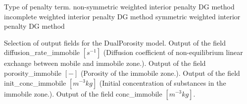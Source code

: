 \begin{SelectionType}
	{}
	{{{Type of penalty term.}}}
		\KeyItem
			{}
			{{{non-symmetric weighted interior penalty DG method}}}
		\KeyItem
			{}
			{{{incomplete weighted interior penalty DG method}}}
		\KeyItem
			{}
			{{{symmetric weighted interior penalty DG method}}}
\end{SelectionType}
\begin{SelectionType}
	{}
	{{{Selection of output fields for the DualPorosity model.}}}
		\KeyItem
			{}
			{{{Output of the field diffusion{\_}rate{\_}immobile }{$[s^{-1}]$}{ (Diffusion coefficient of non-equilibrium linear exchange between mobile and immobile zone.).}}}
		\KeyItem
			{}
			{{{Output of the field porosity{\_}immobile }{$[-]$}{ (Porosity of the immobile zone.).}}}
		\KeyItem
			{}
			{{{Output of the field init{\_}conc{\_}immobile }{$[m^{-3}kg]$}{ (Initial concentration of substances in the immobile zone.).}}}
		\KeyItem
			{}
			{{{Output of the field conc{\_}immobile }{$[m^{-3}kg]$}{.}}}
\end{SelectionType}
\begin{SelectionType}
	{}
	{}
\end{SelectionType}
